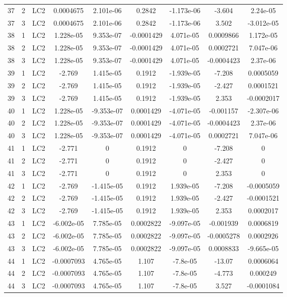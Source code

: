 \documentclass{article}%
\begin{document}
\begin{longtable}{| c c c | c c c c c c |}
37&2&LC2&0.0004675&2.101e{-}06&0.2842&{-}1.173e{-}06&{-}3.604&2.24e{-}05\\%
37&3&LC2&0.0004675&2.101e{-}06&0.2842&{-}1.173e{-}06&3.502&{-}3.012e{-}05\\%
38&1&LC2&1.228e{-}05&9.353e{-}07&{-}0.0001429&4.071e{-}05&0.0009866&1.172e{-}05\\%
38&2&LC2&1.228e{-}05&9.353e{-}07&{-}0.0001429&4.071e{-}05&0.0002721&7.047e{-}06\\%
38&3&LC2&1.228e{-}05&9.353e{-}07&{-}0.0001429&4.071e{-}05&{-}0.0004423&2.37e{-}06\\%
39&1&LC2&{-}2.769&1.415e{-}05&0.1912&{-}1.939e{-}05&{-}7.208&0.0005059\\%
39&2&LC2&{-}2.769&1.415e{-}05&0.1912&{-}1.939e{-}05&{-}2.427&0.0001521\\%
39&3&LC2&{-}2.769&1.415e{-}05&0.1912&{-}1.939e{-}05&2.353&{-}0.0002017\\%
40&1&LC2&1.228e{-}05&{-}9.353e{-}07&0.0001429&{-}4.071e{-}05&{-}0.001157&{-}2.307e{-}06\\%
40&2&LC2&1.228e{-}05&{-}9.353e{-}07&0.0001429&{-}4.071e{-}05&{-}0.0004423&2.37e{-}06\\%
40&3&LC2&1.228e{-}05&{-}9.353e{-}07&0.0001429&{-}4.071e{-}05&0.0002721&7.047e{-}06\\%
41&1&LC2&{-}2.771&0&0.1912&0&{-}7.208&0\\%
41&2&LC2&{-}2.771&0&0.1912&0&{-}2.427&0\\%
41&3&LC2&{-}2.771&0&0.1912&0&2.353&0\\%
42&1&LC2&{-}2.769&{-}1.415e{-}05&0.1912&1.939e{-}05&{-}7.208&{-}0.0005059\\%
42&2&LC2&{-}2.769&{-}1.415e{-}05&0.1912&1.939e{-}05&{-}2.427&{-}0.0001521\\%
42&3&LC2&{-}2.769&{-}1.415e{-}05&0.1912&1.939e{-}05&2.353&0.0002017\\%
43&1&LC2&{-}6.002e{-}05&7.785e{-}05&0.0002822&{-}9.097e{-}05&{-}0.001939&0.0006819\\%
43&2&LC2&{-}6.002e{-}05&7.785e{-}05&0.0002822&{-}9.097e{-}05&{-}0.0005278&0.0002926\\%
43&3&LC2&{-}6.002e{-}05&7.785e{-}05&0.0002822&{-}9.097e{-}05&0.0008833&{-}9.665e{-}05\\%
44&1&LC2&{-}0.0007093&4.765e{-}05&1.107&{-}7.8e{-}05&{-}13.07&0.0006064\\%
44&2&LC2&{-}0.0007093&4.765e{-}05&1.107&{-}7.8e{-}05&{-}4.773&0.000249\\%
44&3&LC2&{-}0.0007093&4.765e{-}05&1.107&{-}7.8e{-}05&3.527&{-}0.0001084\\%

\end{longtable}
\end{document}

